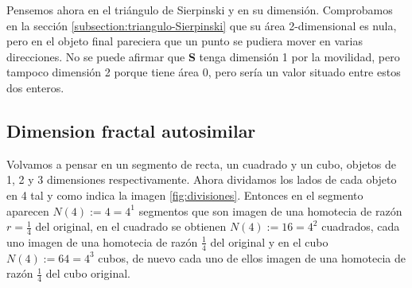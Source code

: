 Pensemos ahora en el triángulo de Sierpinski y en su dimensión. Comprobamos en la sección \ref{subsection:triangulo-Sierpinski} que su área 2-dimensional es nula, pero en el objeto final pareciera que un punto se pudiera mover en varias direcciones. No se puede afirmar que \textbf{S} tenga dimensión 1 por la movilidad, pero tampoco dimensión 2 porque tiene área 0, pero sería un valor situado entre estos dos enteros.

\subsection{Dimension fractal autosimilar}
\label{subsection:dim-frac-autosimilar}

Volvamos a pensar en un segmento de recta, un cuadrado y un cubo, objetos de 1, 2 y 3 dimensiones respectivamente. Ahora dividamos los lados de cada objeto en 4 tal y como indica la imagen \ref{fig:divisiones}. Entonces en el segmento aparecen $N(4):=4=4^1$ segmentos que son imagen de una homotecia de razón $r=\frac 1 4$ del original, en el cuadrado se obtienen $N(4):=16=4^2$ cuadrados, cada uno imagen de una homotecia de razón $\frac 1 4$ del original y en el cubo $N(4):=64=4^3$ cubos, de nuevo cada uno de ellos imagen de una homotecia de razón $\frac 1 4$ del cubo original.

